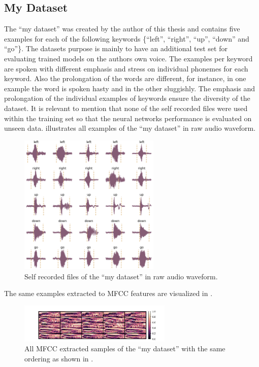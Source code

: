 \FloatBarrier
\noindent



\subsection{My Dataset}\label{sec:exp_dataset_my}
The \enquote{my dataset} was created by the author of this thesis and contains five examples for each of the following keywords \{\enquote{left}, \enquote{right}, \enquote{up}, \enquote{down} and \enquote{go}\}.
The datasets purpose is mainly to have an additional test set for evaluating trained models on the authors own voice.
The examples per keyword are spoken with different emphasis and stress on individual phonemes for each keyword.
Also the prolongation of the words are different, for instance, in one example the word is spoken hasty and in the other sluggishly.
The emphasis and prolongation of the individual examples of keywords ensure the diversity of the dataset.
It is relevant to mention that none of the self recorded files were used within the training set so that the neural networks performance is evaluated on unseen data.
 illustrates all examples of the \enquote{my dataset} in raw audio waveform.
\begin{figure}[!ht]
  \centering
    \includegraphics[width=0.6\textwidth]{./5_exp/figs/exp_dataset_my_wav_grid.png}
  \caption{Self recorded files of the \enquote{my dataset} in raw audio waveform.}
  \label{fig:exp_dataset_my_wav_grid}
\end{figure}
\FloatBarrier
\noindent
The same examples extracted to MFCC features are visualized in .
\begin{figure}[!ht]
  \centering
    \includegraphics[width=0.65\textwidth]{./5_exp/figs/exp_dataset_my_mfcc.png}
  \caption{All MFCC extracted samples of the \enquote{my dataset} with the same ordering as shown in .}
  \label{fig:exp_dataset_my_mfcc}
\end{figure}
